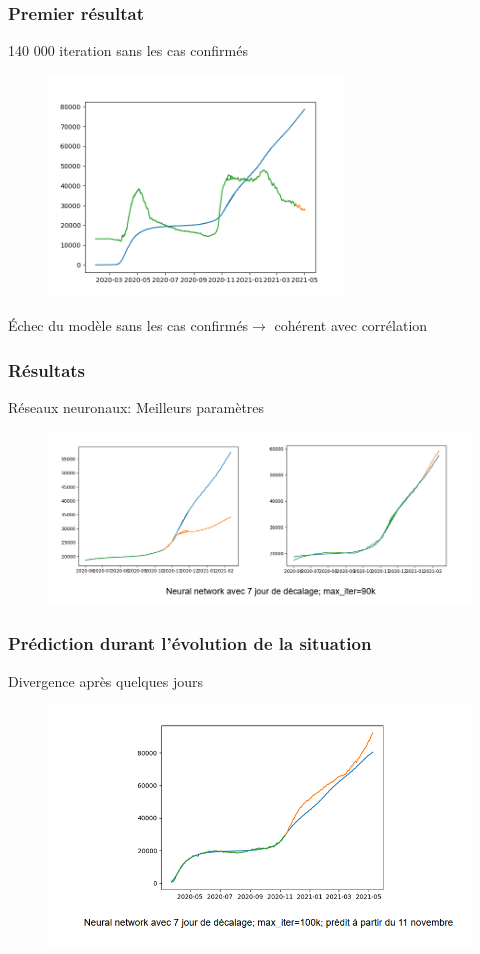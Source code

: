 \documentclass{beamer}
\begin{document}
\begin{frame}
	\frametitle{Premier résultat}
	140 000 iteration sans les cas confirmés
	\begin{figure}[h]
		\centering
		\includegraphics[width=0.7\textwidth]{NN mlpregressor 140k iter (updated data)}
	\end{figure}
	Échec du modèle sans les cas confirmés$\rightarrow$ cohérent avec corrélation
\end{frame}

\begin{frame}
	\frametitle{Résultats}
	Réseaux neuronaux: Meilleurs paramètres
	\begin{figure}
		\includegraphics[scale=0.6]{NN_3}
	\end{figure}
\end{frame}

\begin{frame}
	\frametitle{Prédiction durant l'évolution de la situation}
	Divergence après quelques jours
	\begin{figure}[h]
		\centering
		\includegraphics[width=\textwidth]{NN_1}
	\end{figure}
\end{frame}
\end{document}
